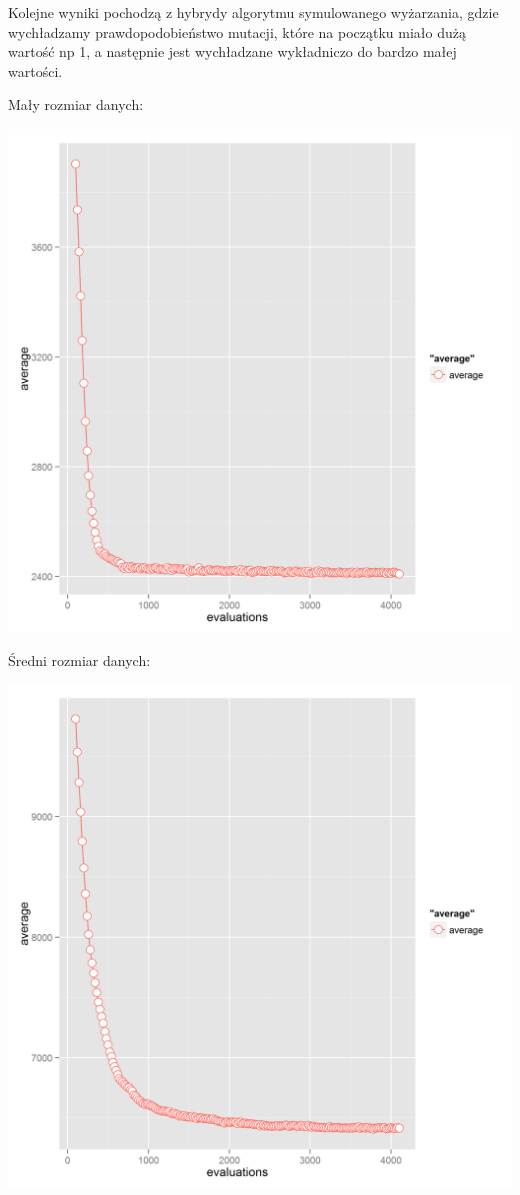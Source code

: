 Kolejne wyniki pochodzą z hybrydy algorytmu symulowanego wyżarzania, gdzie wychładzamy prawdopodobieństwo mutacji, które na początku miało dużą wartość np 1, a następnie jest wychładzane wykładniczo do bardzo małej wartości.

Mały rozmiar danych:

\includegraphics[]{mutation_cooling_graph0.png}

Średni rozmiar danych:

\includegraphics[]{mutation_cooling_graph1.png}

